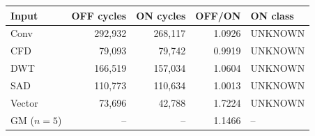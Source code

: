 \begin{tabular}{lrrrl}
\hline
Input & OFF cycles & ON cycles & OFF/ON & ON class \\
\hline
Conv & 292,932 & 268,117 & 1.0926 & UNKNOWN \\
CFD & 79,093 & 79,742 & 0.9919 & UNKNOWN \\
DWT & 166,519 & 157,034 & 1.0604 & UNKNOWN \\
SAD & 110,773 & 110,634 & 1.0013 & UNKNOWN \\
Vector & 73,696 & 42,788 & 1.7224 & UNKNOWN \\
\hline
GM ($n=5$) & -- & -- & 1.1466 & -- \\
\hline
\end{tabular}
